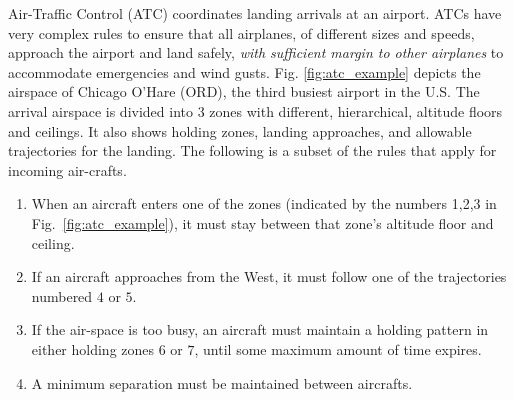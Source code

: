 \begin{exmp}
\label{ex:ATC_example}
Air-Traffic Control (ATC) coordinates landing arrivals at an airport. 
ATCs have very complex rules to ensure that all airplanes, of different sizes and speeds, approach the airport and land safely, \textit{with sufficient margin to other airplanes} to accommodate emergencies and wind gusts.
Fig. \ref{fig:atc_example} depicts the airspace of Chicago O'Hare (ORD), the third busiest airport in the U.S.
The arrival airspace is divided into 3 zones with different, hierarchical, altitude floors and ceilings. 
It also shows holding zones, landing approaches, and allowable trajectories for the landing. 
The following is a subset of the rules that apply for incoming air-crafts.

\begin{enumerate}
\vspace{-1pt}
\item When an aircraft enters one of the zones (indicated by the numbers 1,2,3 in Fig.~\ref{fig:atc_example}), it must stay between that zone's altitude floor and ceiling.%
\label{rule:floor ceiling}
\vspace{-1pt}
\item If an aircraft approaches from the West, it must follow one of the trajectories numbered $4$ or $5$. 
\label{rule:waypoints}
\vspace{-1pt}
\item If the air-space is too busy, an aircraft must maintain a holding pattern in either holding zones $6$ or $7$, until some maximum amount of time expires.
\label{rule:holding}
\vspace{-1pt}
\item A minimum separation must be maintained between aircrafts.
\vspace{-1pt}
\end{enumerate}
\end{exmp}
